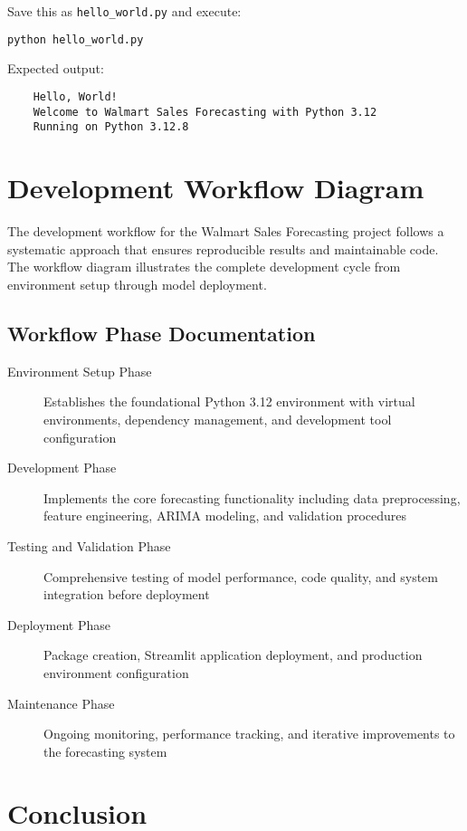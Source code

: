Save this as \texttt{hello\_world.py} and execute:

\begin{lstlisting}[language=bash]
	python hello_world.py
\end{lstlisting}

Expected output:
\begin{verbatim}
	Hello, World!
	Welcome to Walmart Sales Forecasting with Python 3.12
	Running on Python 3.12.8
\end{verbatim}


\section{Development Workflow Diagram}

The development workflow for the Walmart Sales Forecasting project follows a systematic approach that ensures reproducible results and maintainable code. The workflow diagram illustrates the complete development cycle from environment setup through model deployment.






\subsection{Workflow Phase Documentation}

\begin{description}
	\item[Environment Setup Phase] Establishes the foundational Python 3.12 environment with virtual environments, dependency management, and development tool configuration
	\item[Development Phase] Implements the core forecasting functionality including data preprocessing, feature engineering, ARIMA modeling, and validation procedures
	\item[Testing and Validation Phase] Comprehensive testing of model performance, code quality, and system integration before deployment
	\item[Deployment Phase] Package creation, Streamlit application deployment, and production environment configuration
	\item[Maintenance Phase] Ongoing monitoring, performance tracking, and iterative improvements to the forecasting system
\end{description}

\section{Conclusion}

